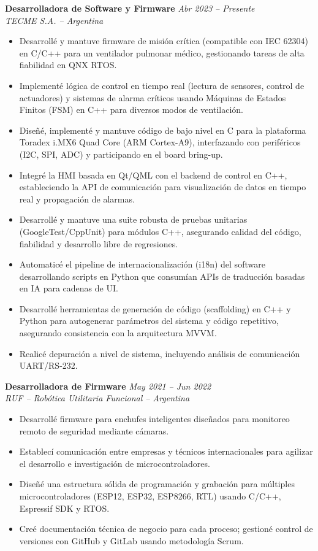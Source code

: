 \documentclass[11pt,a4paper]{article}
\newcommand{\resumeItem}[1]{\item #1}
\newcommand{\jobentry}[3]{%
    \noindent\textbf{#1} \hfill \textit{#2}\\
    \textit{#3}
}
\begin{document}
\jobentry{Desarrolladora de Software y Firmware}{Abr 2023 -- Presente}{TECME S.A. -- Argentina}
\begin{itemize}[leftmargin=*, nosep, topsep=4pt]
    \resumeItem{Desarroll\'{e} y mantuve firmware de misi\'{o}n cr\'{i}tica (compatible con IEC 62304) en C/C++ para un ventilador pulmonar m\'{e}dico, gestionando tareas de alta fiabilidad en QNX RTOS.}
    \resumeItem{Implement\'{e} l\'{o}gica de control en tiempo real (lectura de sensores, control de actuadores) y sistemas de alarma cr\'{i}ticos usando M\'{a}quinas de Estados Finitos (FSM) en C++ para diversos modos de ventilaci\'{o}n.}
    \resumeItem{Dise\~{n}\'{e}, implement\'{e} y mantuve c\'{o}digo de bajo nivel en C para la plataforma Toradex i.MX6 Quad Core (ARM Cortex-A9), interfazando con perif\'{e}ricos (I2C, SPI, ADC) y participando en el board bring-up.}
    \resumeItem{Integr\'{e} la HMI basada en Qt/QML con el backend de control en C++, estableciendo la API de comunicaci\'{o}n para visualizaci\'{o}n de datos en tiempo real y propagaci\'{o}n de alarmas.}
    \resumeItem{Desarroll\'{e} y mantuve una suite robusta de pruebas unitarias (GoogleTest/CppUnit) para m\'{o}dulos C++, asegurando calidad del c\'{o}digo, fiabilidad y desarrollo libre de regresiones.}
    \resumeItem{Automatic\'{e} el pipeline de internacionalizaci\'{o}n (i18n) del software desarrollando scripts en Python que consum\'{i}an APIs de traducci\'{o}n basadas en IA para cadenas de UI.}
    \resumeItem{Desarroll\'{e} herramientas de generaci\'{o}n de c\'{o}digo (scaffolding) en C++ y Python para autogenerar par\'{a}metros del sistema y c\'{o}digo repetitivo, asegurando consistencia con la arquitectura MVVM.}
    \resumeItem{Realic\'{e} depuraci\'{o}n a nivel de sistema, incluyendo an\'{a}lisis de comunicaci\'{o}n UART/RS-232.}
\end{itemize}

\vspace{6pt}

\jobentry{Desarrolladora de Firmware}{May 2021 -- Jun 2022}{RUF -- Rob\'{o}tica Utilitaria Funcional -- Argentina}
\begin{itemize}[leftmargin=*, nosep, topsep=4pt]
    \resumeItem{Desarroll\'{e} firmware para enchufes inteligentes dise\~{n}ados para monitoreo remoto de seguridad mediante c\'{a}maras.}
    \resumeItem{Establec\'{i} comunicaci\'{o}n entre empresas y t\'{e}cnicos internacionales para agilizar el desarrollo e investigaci\'{o}n de microcontroladores.}
    \resumeItem{Dise\~{n}\'{e} una estructura s\'{o}lida de programaci\'{o}n y grabaci\'{o}n para m\'{u}ltiples microcontroladores (ESP12, ESP32, ESP8266, RTL) usando C/C++, Espressif SDK y RTOS.}
    \resumeItem{Cre\'{e} documentaci\'{o}n t\'{e}cnica de negocio para cada proceso; gestion\'{e} control de versiones con GitHub y GitLab usando metodolog\'{i}a Scrum.}
\end{itemize}
\end{document}
